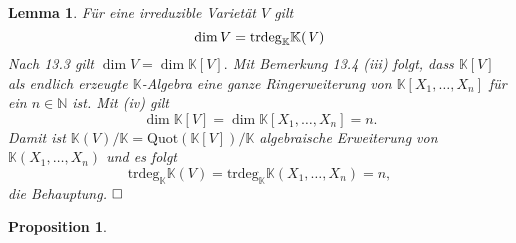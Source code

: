 \documentclass[11pt]{book}
\newtheorem{lemma}[theorem]{Lemma}
\newtheorem{prop}[theorem]{Proposition}
\theoremstyle{nonumberbreak}
\newenvironment{pr}[1][]{\ifthenelse{\equal{#1}{}}{\proof}{\proof[#1]}\rm}{\endproof}
\begin{document}
\begin{spacing}{1.3}
\begin{lemma} %
Für eine irreduzible Varietät $V$ gilt
$$\dim V = \rm{trdeg}\it_{\mathbb{K}} \mathbb{K}(V)$$
\begin{pr}
Nach 13.3 gilt
$\dim V = \dim \mathbb{K}[V].$
Mit Bemerkung 13.4 (iii) folgt, dass $\mathbb{K}[V]$ als endlich erzeugte $\mathbb{K}$-Algebra eine ganze Ringerweiterung von $\mathbb{K}[X_1, \ldots, X_n]$ für ein $n \in \mathbb{N}$ ist. Mit (iv) gilt
$$\dim \mathbb{K}[V] = \dim \mathbb{K}[X_1, \ldots, X_n] = n.$$
Damit ist $\mathbb{K}(V) / \mathbb{K} = \textrm{Quot}(\mathbb{K}[V]) / \mathbb{K}$
algebraische Erweiterung von $\mathbb{K}(X_1, \ldots, X_n)$ und es folgt
$$\textrm{trdeg}_{\mathbb{K}} \mathbb{K}(V) = \textrm{trdeg}_{\mathbb{K}} \mathbb{K}(X_1, \ldots, X_n) = n,$$
die Behauptung. $\hfill \Box$
\end{pr}
\end{lemma}

\begin{prop} %


\end{prop}
\end{spacing}
\end{document}
